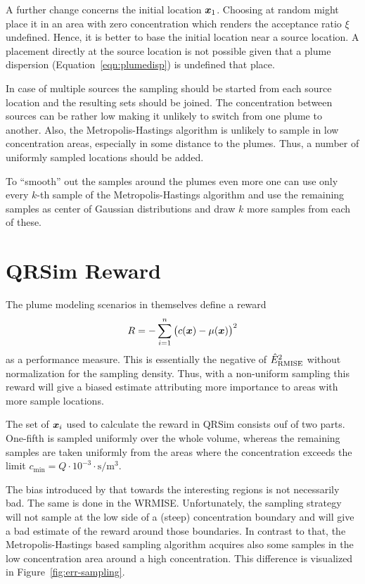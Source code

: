 A further change concerns the initial location $\bm{x}_1$. Choosing at random 
might place it in an area with zero concentration which renders the acceptance 
ratio $\xi$ undefined. Hence, it is better to base the initial location near 
a source location. A placement directly at the source location is not possible 
given that a plume dispersion (Equation~\ref{eqn:plumedisp}) is undefined that 
place.

In case of multiple sources the sampling should be started from each source 
location and the resulting sets should be joined. The concentration between 
sources can be rather low making it unlikely to switch from one plume to 
another. Also, the Metropolis-Hastings algorithm is unlikely to sample in low 
concentration areas, especially in some distance to the plumes. Thus, a number 
of uniformly sampled locations should be added.

To ``smooth'' out the samples around the plumes even more one can use only every 
$k$-th sample of the Metropolis-Hastings algorithm and use the remaining samples 
as center of Gaussian distributions and draw $k$ more samples from each of 
these.

\section{QRSim Reward}\label{sec:qrsim-reward}
The plume modeling scenarios in \textcite{denardi2013rn} themselves define 
a reward
\begin{equation}
    R = - \sum_{i = 1}^n \del{c(\vc x) - \mu(\vc x)}^2
\end{equation}
as a performance measure. This is essentially the negative of 
$\hat{E}_{\mathrm{RMISE}}^2$ without normalization for the sampling density. Thus, 
with a non-uniform sampling this reward will give a biased estimate attributing 
more importance to areas with more sample locations.

The set of $\bm{x}_i$ used to calculate the reward in QRSim consists ouf of two 
parts. One-fifth is sampled uniformly over the whole volume, whereas the 
remaining samples are taken uniformly from the areas where the concentration 
exceeds the limit $c_{\min} = Q \cdot 10^{-3} \cdot 
\si{\second\per\meter\cubed}$.

The bias introduced by that towards the interesting regions is not necessarily 
bad. The same is done in the WRMISE\@. Unfortunately, the sampling strategy will 
not sample at the low side of a (steep) concentration boundary and will give 
a bad estimate of the reward around those boundaries. In contrast to that, the 
Metropolis-Hastings based sampling algorithm acquires also some samples in the 
low concentration area around a high concentration.  This difference is 
visualized in Figure~\ref{fig:err-sampling}.

